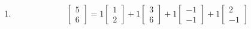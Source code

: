 \begin{SaveQuestion}
\begin{enumerate}
$$\begin{bmatrix}
        \end{bmatrix} + x_4 \begin{bmatrix}
            3 \\ 0 \\ 5 \\ 1
        \end{bmatrix} + \begin{bmatrix}
            1 \\ 0 \\ -4 \\ 0
        \end{bmatrix} | x_2, x_4 \in \bbR \right\}$$
        \item $$\begin{bmatrix}
            5 \\ 6
        \end{bmatrix} = 1 \begin{bmatrix}
            1 \\ 2
        \end{bmatrix} + 1 \begin{bmatrix}
            3 \\ 6 
        \end{bmatrix} + 1 \begin{bmatrix}
            -1 \\ -1
        \end{bmatrix} + 1 \begin{bmatrix}
            2 \\ -1
        \end{bmatrix}$$
    \end{enumerate}


\end{SaveQuestion}
